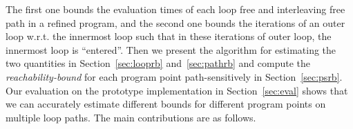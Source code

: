 The first one bounds the evaluation times of each loop free and interleaving free path in a refined program, and the second one bounds the iterations of an outer loop w.r.t. the innermost loop such that in these iterations of outer loop, the innermost loop is ``entered''. 
Then we present the algorithm for estimating the two quantities in Section~\ref{sec:looprb} and~\ref{sec:pathrb} and compute the \emph{reachability-bound} for each program point path-sensitively in Section~\ref{sec:psrb}.
Our evaluation on the prototype implementation in Section~\ref{sec:eval} shows that we can accurately estimate different bounds for different program points on multiple loop paths. The main contributions are as follows.

